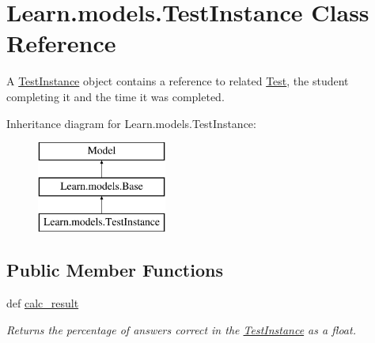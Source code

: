 \hypertarget{class_learn_1_1models_1_1_test_instance}{\section{Learn.\-models.\-Test\-Instance Class Reference}
\label{class_learn_1_1models_1_1_test_instance}
}


A \hyperlink{class_learn_1_1models_1_1_test_instance}{Test\-Instance} object contains a reference to related \hyperlink{class_learn_1_1models_1_1_test}{Test}, the student completing it and the time it was completed.  


Inheritance diagram for Learn.\-models.\-Test\-Instance\-:\begin{figure}[H]
\begin{center}
\leavevmode
\includegraphics[height=3.000000cm]{class_learn_1_1models_1_1_test_instance}
\end{center}
\end{figure}
\subsection*{Public Member Functions}
\begin{DoxyCompactItemize}
\item 
\hypertarget{class_learn_1_1models_1_1_test_instance_ac5718c6c40673cfe7b1e6bdbc277c1d1}{def \hyperlink{class_learn_1_1models_1_1_test_instance_ac5718c6c40673cfe7b1e6bdbc277c1d1}{calc\-\_\-result}}\label{class_learn_1_1models_1_1_test_instance_ac5718c6c40673cfe7b1e6bdbc277c1d1}

\begin{DoxyCompactList}\small\item\em Returns the percentage of answers correct in the \hyperlink{class_learn_1_1models_1_1_test_instance}{Test\-Instance} as a float. \end{DoxyCompactList}\end{DoxyCompactItemize}
